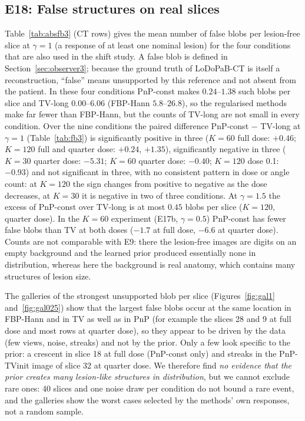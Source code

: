 \subsection{E18: False structures on real slices}\label{sec:e18}
Table~\ref{tab:absfb3} (CT rows) gives the mean number of false blobs per lesion-free slice at $\gamma=1$ (a response of at least one nominal lesion) for the four conditions that are also used in the shift study. A false blob is defined in Section~\ref{sec:observer3}; because the ground truth of LoDoPaB-CT is itself a reconstruction, ``false'' means unsupported by this reference and not absent from the patient.
In these four conditions PnP-const makes $0.24$--$1.38$ such blobs per slice and TV-long $0.00$--$6.06$ (FBP-Hann $5.8$--$26.8$), so the regularised methods make far fewer than FBP-Hann, but the counts of TV-long are not small in every condition.
Over the nine conditions the paired difference PnP-const $-$ TV-long at $\gamma=1$ (Table~\ref{tab:fb3}) is significantly positive in three ($K=60$ full dose: $+0.46$; $K=120$ full and quarter dose: $+0.24$, $+1.35$), significantly negative in three ($K=30$ quarter dose: $-5.31$; $K=60$ quarter dose: $-0.40$; $K=120$ dose 0.1: $-0.93$) and not significant in three, with no consistent pattern in dose or angle count: at $K=120$ the sign changes from positive to negative as the dose decreases, at $K=30$ it is negative in two of three conditions.
At $\gamma=1.5$ the excess of PnP-const over TV-long is at most $0.45$ blobs per slice ($K=120$, quarter dose). In the $K=60$ experiment (E17b, $\gamma=0.5$) PnP-const has fewer false blobs than TV at both doses ($-1.7$ at full dose, $-6.6$ at quarter dose). Counts are not comparable with E9: there the lesion-free images are digits on an empty background and the learned prior produced essentially none in distribution, whereas here the background is real anatomy, which contains many structures of lesion size.

The galleries of the strongest unsupported blob per slice (Figures~\ref{fig:gal1} and~\ref{fig:gal025}) show that the largest false blobs occur at the same location in FBP-Hann and in TV as well as in PnP (for example the slices 28 and 9 at full dose and most rows at quarter dose), so they appear to be driven by the data (few views, noise, streaks) and not by the prior. Only a few look specific to the prior: a crescent in slice 18 at full dose
(PnP-const only) and streaks in the PnP-TVinit image of slice 32 at quarter dose. We therefore find \emph{no evidence that the prior creates many lesion-like structures in distribution}, but we cannot exclude rare ones: 40 slices and one noise draw per condition do not bound a rare event, and the galleries show the worst cases selected by the methods' own responses, not a random sample.


